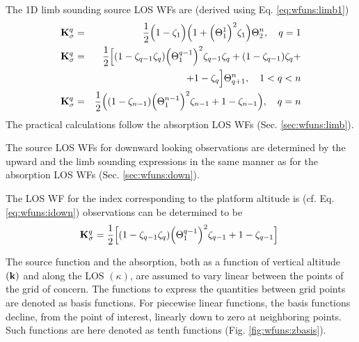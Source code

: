   \label{sec:wfuns:limb2}
  The 1D limb sounding source LOS WFs are (derived using Eq.
  \ref{eq:wfuns:limb1})
  \begin{eqnarray}
    \mathbf{K}_{\sigma}^q & = & \frac{1}{2} \Big(1-\zeta_1\Big) \Big(1+
        \Big( \Theta^1_1 \Big)^2\zeta_1 \Big) \Theta^n_2, 
                                                    \quad q=1  \nonumber \\
    \mathbf{K}_{\sigma}^q & = & \frac{1}{2} \Big[ (1-\zeta_{q-1}\zeta_q)
           \Big(\Theta^{q-1}_{1}\Big)^2\zeta_{q-1}\zeta_q + 
           (1-\zeta_{q-1})\zeta_q + \nonumber \\
      & & + 1-\zeta_q \Big] \Theta^n_{q+1}, \quad 1<q<n \\
    \mathbf{K}_{\sigma}^q & = & \frac{1}{2} \Big( (1-\zeta_{n-1}) \Big(
           \Theta^{n-1}_{1}\Big)^2\zeta_{n-1} + 1-\zeta_{n-1} \Big), \quad q=n \nonumber
  \end{eqnarray}
  The practical calculations follow the absorption LOS WFs (Sec.
  \ref{sec:wfuns:limb}).


  \label{sec:wfuns:down2}
  The source LOS WFs for downward looking observations are determined
  by the upward and the limb sounding expressions in the same manner
  as for the absorption LOS WFs (Sec. \ref{sec:wfuns:down}).

  The LOS WF for the index corresponding to the platform altitude is
  (cf. Eq. \ref{eq:wfuns:idown})
  observations can be determined to be
  \begin{equation}
   \mathbf{K}_{\sigma}^q = \frac{1}{2}\Big[ (1-\zeta_{q-1}\zeta_q) 
           \Big(\Theta^{q-1}_{1}\Big)^2
           \zeta_{q-1} + 1-\zeta_{q-1} \Big]\
  \end{equation}



 \label{sec:wfuns:bases}
 
 The source function and the absorption, both
 as a function of vertical altitude $(\mathbf{k})$ and along the LOS
 $(\kappa)$, are assumed to vary linear between the points of the grid
 of concern. The functions to express the quantities between grid
 points are denoted as basis functions. For piecewise linear functions,
 the basis functions decline, from the point of interest, linearly
 down to zero at neighboring points. Such functions are here denoted
 as tenth functions (Fig. \ref{fig:wfuns:zbasis}).
 
